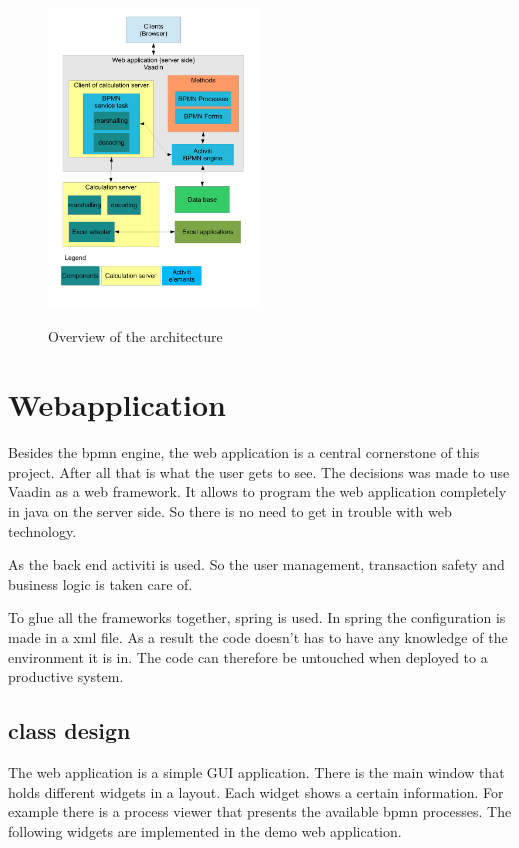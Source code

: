 \documentclass[paper=a4,twoside=false,BCOR=0mm,DIV=calc,fontsize=12pt]{scrartcl}
\begin{document}
\begin{figure}
    \begin{center}
      \includegraphics[width=0.5\textwidth]{./img/ArchitectrueOverview.pdf}\\
    \end{center}
  \caption{Overview of the architecture}
  \label{architectureoverview}
\end{figure} 


\section{Webapplication}
Besides the bpmn engine, the web application is a central cornerstone of this project. After all that is what the user gets to see.
The decisions was made to use Vaadin as a web framework. It allows to program the web application completely in java on the server side. So there is
no need to get in trouble with web technology.

As the back end activiti is used. So the user management, transaction safety and business logic is taken care of.

To glue all the frameworks together, spring is used. In spring the configuration is made in a xml file. As a result the code doesn't has to have any 
knowledge of the environment it is in. The code can therefore be untouched when deployed to a productive system.


\subsection{class design}
The web application is a simple GUI application. There is the main window that holds different widgets in a layout. Each widget shows a certain
information. For example there is a process viewer that presents the available bpmn processes. 
The following widgets are implemented in the demo web application.
\end{document}
